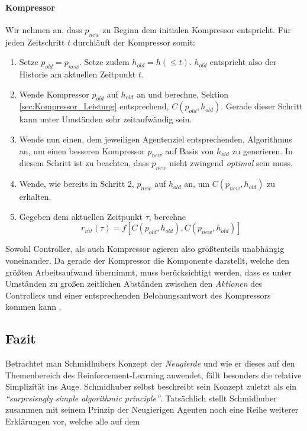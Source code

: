 \paragraph{Kompressor} Wir nehmen an, dass \(p_{new}\) zu Beginn dem initialen Kompressor entspricht. Für jeden Zeitschritt \(t\) durchläuft der Kompressor somit:
\begin{enumerate}
  \item Setze \(p_{old} = p_{new}\). Setze zudem \(h_{old} = h(\leq t)\). \(h_{old}\) entspricht also der Historie am aktuellen Zeitpunkt \(t\).
  \item Wende Kompressor \(p_{old}\) auf \(h_{old}\) an und berechne, Sektion \ref{sec:Kompressor_Leistung} entsprechend, \(C(p_{old},h_{old})\). Gerade dieser Schritt kann unter Umständen sehr zeitaufwändig sein.
  \item Wende nun einen, dem jeweiligen Agentenziel entsprechenden, Algorithmus an, um einen besseren Kompressor \(p_{new}\) auf Basis von \(h_{old}\) zu generieren. In diesem Schritt ist zu beachten, dass \(p_{new}\) nicht zwingend \emph{optimal} sein muss.
  \item Wende, wie bereits in Schritt 2, \(p_{new}\) auf \(h_{old}\) an, um \(C(p_{new},h_{old})\) zu erhalten.
  \item Gegeben dem aktuellen Zeitpunkt \(\tau\), berechne \begin{equation} r_{int}(\tau) = f \left[C(p_{old},h_{old}),C(p_{new},h_{old})\right] \end{equation}
\end{enumerate} 

Sowohl Controller, als auch Kompressor agieren also größtenteils unabhängig voneinander. Da gerade der Kompressor die Komponente darstellt, welche den größten Arbeitsaufwand übernimmt, muss berücksichtigt werden, dass es unter Umständen zu großen zeitlichen Abständen zwischen den \emph{Aktionen} des Controllers und einer entsprechenden Belohungsantwort des Kompressors kommen kann \cite[p.~20]{curiosity_schmidhuber}.

\subsection{Fazit}
Betrachtet man Schmidhubers Konzept der \emph{Neugierde} und wie er dieses auf den Themenbereich des Reinforcement-Learning anwendet, fällt besonders die relative Simplizität ins Auge. Schmidhuber selbst beschreibt sein Konzept zuletzt als ein \emph{``surprsisngly simple algorithmic principle''}\cite[p.~16]{curiosity_schmidhuber}. Tatsächlich stellt Schmidhuber zusammen mit seinem Prinzip der Neugierigen Agenten noch eine Reihe weiterer Erklärungen vor, welche alle auf dem 